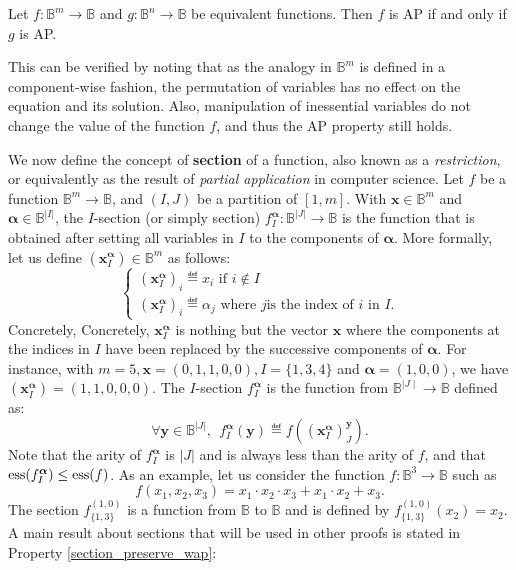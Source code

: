 \begin{property}\label{equivalent_functions}
Let $f\colon \mathbb{B}^m\to \mathbb{B}$ and $g\colon \mathbb{B}^n\to
  \mathbb{B}$ be equivalent functions. Then $f$ is AP if and only if $g$ is AP.
\end{property}

This can be verified by noting that as the analogy in $\mathbb{B}^m$ is defined
in a component-wise fashion, the permutation of variables has no effect on the equation and
its solution. Also, manipulation of inessential variables do not change the
value of the function $f$, and thus the AP property still holds.

We now define the concept of \textbf{section} of a function, also known as a
\textit{restriction}, or equivalently as the result of \textit{partial
application} in computer science. Let $f$ be a function $\mathbb{B}^m\to
\mathbb{B}$, and $(I, J)$ be a partition of $[1, m]$. With $\mathbf{x} \in
\mathbb{B}^m$ and $\boldsymbol{\alpha} \in \mathbb{B}^{|I|}$, the $I$-section
(or simply section) $f^{\boldsymbol{\alpha}}_I \colon \mathbb{B}^{|J|} \to
\mathbb{B}$ is the function that is obtained after setting all variables in $I$
to the components of $\boldsymbol{\alpha}$.  More formally, let us define
$(\mathbf{x}^{\boldsymbol{\alpha}}_I) \in \mathbb{B}^m$ as follows:
$$
\begin{cases}
(\mathbf{x}^{\boldsymbol{\alpha}}_I)_i \eqdef x_i \mbox{ if } i \notin I\\
(\mathbf{x}^{\boldsymbol{\alpha}}_I)_i \eqdef \alpha_j \mbox{ where } j \mbox{
  is the index of } i \mbox{ in } I.
\end{cases}
$$
Concretely, Concretely, $\mathbf{x}^{\boldsymbol{\alpha}}_I$ is nothing but the vector $\mathbf{x}$
where the components at the  indices in $I$ have been replaced by the
successive components of $\boldsymbol{\alpha}$. For instance, with $m=5,
\mathbf{x}=(0,1,1,0,0), I=\{1,3,4\}$ and $\boldsymbol{\alpha}=(1,0,0)$, we
have $(\mathbf{x}^{\boldsymbol{\alpha}}_I)=(1,1,0,0,0)$.  The $I$-section
$f^{\boldsymbol{\alpha}}_I$ is the function from $\mathbb{B}^{\mid J \mid} \to
\mathbb{B}$ defined as:
$$\forall \mathbf{y} \in \mathbb{B}^{|J|},~~
f^{\boldsymbol{\alpha}}_I(\mathbf{y}) \eqdef
f((\mathbf{x}^{\boldsymbol{\alpha}}_I)^\mathbf{y}_J).$$
Note that the arity of $f^{\boldsymbol{\alpha}}_I$ is $|J|$ and is always less
than the arity of $f$, and that
$\operatorname{ess}(f^{\boldsymbol{\alpha}}_I) \leq \operatorname{ess}(f)$.  As an example, let us consider
the function $f\colon \mathbb{B}^3 \to \mathbb{B}$ such as
$$f(x_1,x_2, x_3) = x_1 \cdot x_2 \cdot x_3 + x_1 \cdot x_2 + x_3.$$
The section $f^{(1, 0)}_{\{1, 3\}}$ is a function from $\mathbb{B}$ to
$\mathbb{B}$ and is defined by $f^{(1, 0)}_{\{1, 3\}}(x_2) = x_2$.
A main result about sections that will be used in other proofs is stated in
Property \ref{section_preserve_wap}:

